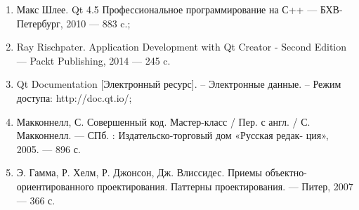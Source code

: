 
\begin{enumerate}
  \item Макс Шлее. Qt 4.5 Профессиональное программирование на С++ ---
  БХВ-Петербург, 2010 --- 883 c.;
  \item Ray Rischpater. Application Development with Qt Creator - Second Edition
  --- Packt Publishing, 2014 --- 245 c.
  \item Qt Documentation [Электронный ресурс]. – Электронные данные. –
  Режим доступа: http://doc.qt.io/;
  \item Макконнелл, С. Совершенный код. Мастер-класс / Пер. с англ. /
  С. Макконнелл. --- СПб. : Издательско-торговый дом «Русская редак-
  ция», 2005. --- 896 с.
  \item Э. Гамма, Р. Хелм, Р. Джонсон, Дж. Влиссидес. Приемы
  объектно-ориентированного проектирования. Паттерны проектирования. --- Питер,
  2007 --- 366 с.
  
\end{enumerate}
